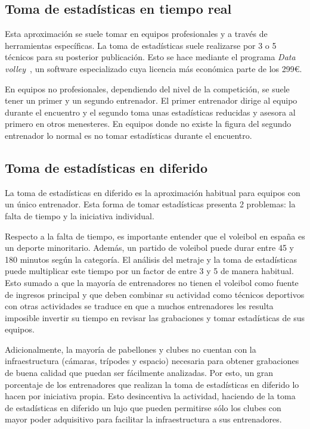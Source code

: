 \documentclass[12pt]{report} %
\begin{document}
    \subsection{Toma de estadísticas en tiempo real}
    
    Esta aproximación se suele tomar en equipos profesionales y a través de
    herramientas específicas. La toma de estadísticas suele realizarse por 3 o
    5 técnicos para su posterior publicación. Esto se hace mediante el programa
    \textit{Data volley}~\cite{datavoley}, un software especializado cuya
    licencia más económica parte de los 299\euro. 

    En equipos no profesionales, dependiendo del nivel de la competición, se
    suele tener un primer y un segundo entrenador. El primer entrenador dirige
    al equipo durante el encuentro y el segundo toma unas estadísticas
    reducidas y asesora al primero en otros menesteres. En equipos donde no
    existe la figura del segundo entrenador lo normal es no tomar estadísticas
    durante el encuentro.

    \subsection{Toma de estadísticas en diferido}

    La toma de estadísticas en diferido es la aproximación habitual para
    equipos con un único entrenador. Esta forma de tomar estadísticas presenta
    2 problemas: la falta de tiempo y la iniciativa individual.

    Respecto a la falta de tiempo, es importante entender que el voleibol en
    españa es un deporte minoritario. Además, un partido de voleibol puede durar
    entre 45 y 180 minutos según la categoría. El análisis del metraje y la
    toma de estadísticas puede multiplicar este tiempo por un factor de entre 3
    y 5 de manera habitual. Esto sumado a que la mayoría de entrenadores no
    tienen el voleibol como fuente de ingresos principal y que deben combinar
    su actividad como técnicos deportivos con otras actividades se
    traduce en que a muchos entrenadores les resulta imposible invertir su
    tiempo en revisar las grabaciones y tomar estadísticas de sus equipos.

    Adicionalmente, la mayoría de pabellones y clubes no cuentan con la
    infraestructura (cámaras, trípodes y espacio) necesaria para obtener
    grabaciones de buena calidad que puedan ser fácilmente analizadas. Por esto, 
    un gran porcentaje de los entrenadores que realizan la toma de estadísticas
    en diferido lo hacen por iniciativa propia. Esto desincentiva la actividad,
    haciendo de la toma de estadísticas en diferido un lujo que pueden
    permitirse sólo los clubes con mayor poder adquisitivo para facilitar la
    infraestructura a sus entrenadores.
    
\end{document}
